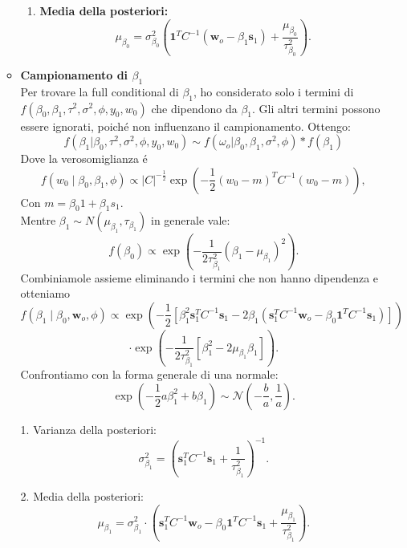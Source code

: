 \documentclass[a4paper,12pt]{article}
\begin{document}
\begin{itemize}
\begin{itemize}
\begin{enumerate}
				\item \textbf{Media della posteriori:}
				\[
				\mu_{\beta_0} = \sigma_{\beta_0}^2 \left( \mathbf{1}^T C^{-1} (\mathbf{w}_o - \beta_1 \mathbf{s}_1) + \frac{\mu_{\beta_0}}{\tau_{\beta_0}^2} \right).
				\]
			\end{enumerate}
			\item \textbf{Campionamento di $\beta_1$}\\
			Per trovare la full conditional di \( \beta_1 \), ho considerato solo i termini di \( f(\beta_0,\beta_1,\tau^2,\sigma^2,\phi , y_0,w_0) \) che dipendono da \( \beta_1 \). Gli altri termini possono essere ignorati, poiché non influenzano il campionamento. Ottengo:
			\[
			f(\beta_1|\beta_0,\tau^2,\sigma^2,\phi , y_0,w_0) \sim f(\omega_o | \beta_0,\beta_1,\sigma^2,\phi)*f(\beta_1)
			\]
			Dove la verosomiglianza é
			\[
			f(w_0 \mid \beta_0, \beta_1, \phi) \propto |C|^{-\frac{1}{2}} \exp \left( -\frac{1}{2} (w_0 - m )^T C^{-1} (w_0 - m) \right),
			\]
			Con $m=\beta_0 1 + \beta_1 s_1$.\\
			Mentre $\beta_1 \sim N(\mu_{\beta_1},\tau_{\beta_1})$ in generale vale:
			\[
			f(\beta_0) \propto \exp \left( -\frac{1}{2\tau_{\beta_1}^2} (\beta_1 - \mu_{\beta_1})^2 \right).
			\]
			Combiniamole assieme eliminando i termini che non hanno dipendenza e otteniamo
			\[
			f(\beta_1 \mid \beta_0, \mathbf{w}_o, \phi) \propto \exp \left( 
			-\frac{1}{2} \left[ 
			\beta_1^2 \mathbf{s}_1^T C^{-1} \mathbf{s}_1 
			- 2\beta_1 \left( \mathbf{s}_1^T C^{-1} \mathbf{w}_o - \beta_0 \mathbf{1}^T C^{-1} \mathbf{s}_1 \right)
			\right] \right)
			\]
			\[
			\cdot \exp \left( 
			-\frac{1}{2\tau_{\beta_1}^2} \left[ 
			\beta_1^2 - 2\mu_{\beta_1} \beta_1
			\right] \right).
			\]
			Confrontiamo con la forma generale di una normale:
			\[
			\exp \left( -\frac{1}{2} a \beta_1^2 + b \beta_1 \right) \sim \mathcal{N} \left( -\frac{b}{a}, \frac{1}{a} \right).
			\]
			
			
			1. Varianza della posteriori:
			\[
			\sigma_{\beta_1}^2 = \left( \mathbf{s}_1^T C^{-1} \mathbf{s}_1 + \frac{1}{\tau_{\beta_1}^2} \right)^{-1}.
			\]
			
			2. Media della posteriori:
			\[
			\mu_{\beta_1} = \sigma_{\beta_1}^2 \cdot \left( 
			\mathbf{s}_1^T C^{-1} \mathbf{w}_o - \beta_0 \mathbf{1}^T C^{-1} \mathbf{s}_1 + \frac{\mu_{\beta_1}}{\tau_{\beta_1}^2} 
			\right).
			\]
			

\end{itemize}
\end{itemize}
\end{document}
